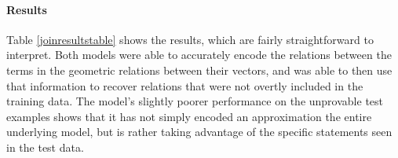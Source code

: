 
\paragraph{Results} 
Table \ref{joinresultstable} shows the results, which are fairly straightforward 
to interpret. Both models were able to accurately encode the relations 
between the terms in the geometric relations between their vectors, 
and was able to then use that information to recover relations that 
were not overtly included in the training data.  The model's slightly 
poorer performance on the unprovable test examples shows that it
 has not simply encoded an approximation the entire underlying 
 model, but is rather taking advantage of the specific statements seen in the test data.
